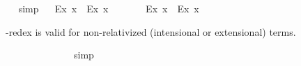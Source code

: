 \begin{isabellebody}
\ %
%
\isamarkupfalse%
\ simp%
%
%
\isanewline
\ \isamarkupfalse%
\ {\isachardoublequoteopen}{\isasymlfloor}{\isacharparenleft}\isactrlbold {\isasymforall}\isactrlsup Ex{\isachardot}\isactrlbold {\isasymbox}{\isacharparenleft}{\isasymphi}\ x{\isacharparenright}{\isacharparenright}\ \isactrlbold {\isasymrightarrow}\ \isactrlbold {\isasymbox}{\isacharparenleft}\isactrlbold {\isasymforall}\isactrlsup Ex{\isachardot}{\isacharparenleft}{\isasymphi}\ x{\isacharparenright}{\isacharparenright}{\isasymrfloor}{\isachardoublequoteclose}\ \isamarkupfalse%
%
\ %
%
\isamarkupfalse%
\ %
%
%
%
\isanewline
\ \isamarkupfalse%
\ {\isachardoublequoteopen}{\isasymlfloor}\isactrlbold {\isasymbox}{\isacharparenleft}\isactrlbold {\isasymforall}\isactrlsup Ex{\isachardot}{\isacharparenleft}{\isasymphi}\ x{\isacharparenright}{\isacharparenright}\ \isactrlbold {\isasymrightarrow}\ {\isacharparenleft}\isactrlbold {\isasymforall}\isactrlsup Ex{\isachardot}\isactrlbold {\isasymbox}{\isacharparenleft}{\isasymphi}\ x{\isacharparenright}{\isacharparenright}{\isasymrfloor}{\isachardoublequoteclose}\ \isamarkupfalse%
%
\ %
%
\isamarkupfalse%
\ %
%
%
%
%
\begin{isamarkuptext}%
\isa{{\isasymbeta}{\isasymeta}}-redex is valid for non-relativized (intensional or extensional) terms.%
\end{isamarkuptext}\isamarkuptrue%
\ \isamarkupfalse%
\ {\isachardoublequoteopen}{\isasymlfloor}{\isacharparenleft}{\isacharparenleft}{\isasymlambda}{\isasymalpha}{\isachardot}\ {\isasymphi}\ {\isasymalpha}{\isacharparenright}\ \ {\isacharparenleft}{\isasymtau}{\isacharcolon}{\isacharcolon}{\isasymup}{\isasymzero}{\isacharparenright}{\isacharparenright}\ \isactrlbold {\isasymleftrightarrow}\ {\isacharparenleft}{\isasymphi}\ \ {\isasymtau}{\isacharparenright}{\isasymrfloor}{\isachardoublequoteclose}%
\ %
%
\isamarkupfalse%
\ simp%
%
%
\isanewline
\ \isamarkupfalse%
\ {\isachardoublequoteopen}{\isasymlfloor}{\isacharparenleft}{\isacharparenleft}{\isasymlambda}{\isasymalpha}{\isachardot}\ {\isasymphi}\ {\isasymalpha}{\isacharparenright}\ \ {\isacharparenleft}{\isasymtau}{\isacharcolon}{\isacharcolon}{\isasymzero}{\isacharparenright}{\isacharparenright}\ \isactrlbold {\isasymleftrightarrow}\ {\isacharparenleft}{\isasymphi}\ \ {\isasymtau}{\isacharparenright}{\isasymrfloor}{\isachardoublequoteclose}%

\end{isabellebody}

